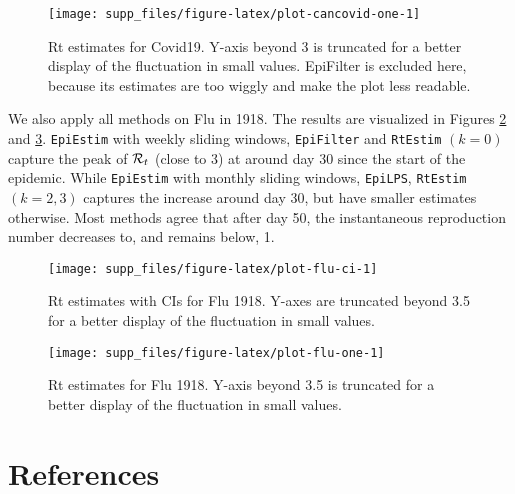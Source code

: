 \documentclass[
]{article}
\begin{document}
\begin{figure}[!ht]

{\centering \texttt{[image: supp\_files/figure-latex/plot-cancovid-one-1]} 

}

\caption{Rt estimates for Covid19. Y-axis beyond 3 is truncated for a better display of the fluctuation in small values. EpiFilter is excluded here, because its estimates are too wiggly and make the plot less readable.}\label{fig:plot-cancovid-one}
\end{figure}

\clearpage

We also apply all methods on Flu in 1918. The results are visualized in Figures
\ref{fig:plot-flu-ci} and \ref{fig:plot-flu-one}.
\texttt{EpiEstim} with weekly sliding windows, \texttt{EpiFilter} and \texttt{RtEstim} \((k=0)\) capture
the peak of \(\mathcal{R}_t\) (close to 3)
at around day 30 since the start of the epidemic. While \texttt{EpiEstim} with monthly
sliding windows, \texttt{EpiLPS}, \texttt{RtEstim} \((k=2,3)\) captures the increase around day 30,
but have smaller estimates otherwise. Most methods agree that after day 50, the
instantaneous reproduction number decreases to, and remains below, 1.

\begin{figure}[!ht]

{\centering \texttt{[image: supp\_files/figure-latex/plot-flu-ci-1]} 

}

\caption{Rt estimates with CIs for Flu 1918. Y-axes are truncated beyond 3.5 for a better display of the fluctuation in small values.}\label{fig:plot-flu-ci}
\end{figure}

\begin{figure}[!ht]

{\centering \texttt{[image: supp\_files/figure-latex/plot-flu-one-1]} 

}

\caption{Rt estimates for Flu 1918. Y-axis beyond 3.5 is truncated for a better display of the fluctuation in small values.}\label{fig:plot-flu-one}
\end{figure}

\clearpage

\section*{References}\label{references}
\end{document}
